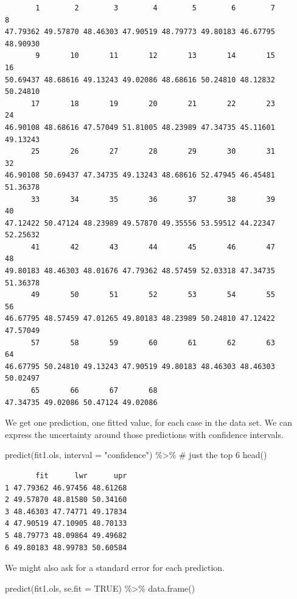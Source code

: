 \documentclass[
  letterpaper,
  DIV=11,
  numbers=noendperiod]{scrartcl}
\newenvironment{Shaded}{\begin{snugshade}}{\end{snugshade}}
\newcommand{\AttributeTok}[1]{\textcolor[rgb]{0.40,0.45,0.13}{#1}}
\newcommand{\CommentTok}[1]{\textcolor[rgb]{0.37,0.37,0.37}{#1}}
\newcommand{\ConstantTok}[1]{\textcolor[rgb]{0.56,0.35,0.01}{#1}}
\newcommand{\FunctionTok}[1]{\textcolor[rgb]{0.28,0.35,0.67}{#1}}
\newcommand{\NormalTok}[1]{\textcolor[rgb]{0.00,0.23,0.31}{#1}}
\newcommand{\SpecialCharTok}[1]{\textcolor[rgb]{0.37,0.37,0.37}{#1}}
\newcommand{\StringTok}[1]{\textcolor[rgb]{0.13,0.47,0.30}{#1}}
\begin{document}
\begin{verbatim}
       1        2        3        4        5        6        7        8 
47.79362 49.57870 48.46303 47.90519 48.79773 49.80183 46.67795 48.90930 
       9       10       11       12       13       14       15       16 
50.69437 48.68616 49.13243 49.02086 48.68616 50.24810 48.12832 50.24810 
      17       18       19       20       21       22       23       24 
46.90108 48.68616 47.57049 51.81005 48.23989 47.34735 45.11601 49.13243 
      25       26       27       28       29       30       31       32 
46.90108 50.69437 47.34735 49.13243 48.68616 52.47945 46.45481 51.36378 
      33       34       35       36       37       38       39       40 
47.12422 50.47124 48.23989 49.57870 49.35556 53.59512 44.22347 52.25632 
      41       42       43       44       45       46       47       48 
49.80183 48.46303 48.01676 47.79362 48.57459 52.03318 47.34735 51.36378 
      49       50       51       52       53       54       55       56 
46.67795 48.57459 47.01265 49.80183 48.23989 50.24810 47.12422 47.57049 
      57       58       59       60       61       62       63       64 
46.67795 50.24810 49.13243 47.90519 49.80183 48.46303 48.46303 50.02497 
      65       66       67       68 
47.34735 49.02086 50.47124 49.02086 
\end{verbatim}

We get one prediction, one fitted value, for each case in the data set.
We can express the uncertainty around those predictions with confidence
intervals.

\begin{Shaded}
\begin{Highlighting}[]
\FunctionTok{predict}\NormalTok{(fit1.ols,}
        \AttributeTok{interval =} \StringTok{"confidence"}\NormalTok{) }\SpecialCharTok{\%\textgreater{}\%} 
  \CommentTok{\# just the top 6}
  \FunctionTok{head}\NormalTok{()}
\end{Highlighting}
\end{Shaded}

\begin{verbatim}
       fit      lwr      upr
1 47.79362 46.97456 48.61268
2 49.57870 48.81580 50.34160
3 48.46303 47.74771 49.17834
4 47.90519 47.10905 48.70133
5 48.79773 48.09864 49.49682
6 49.80183 48.99783 50.60584
\end{verbatim}

We might also ask for a standard error for each prediction.

\begin{Shaded}
\begin{Highlighting}[]
\FunctionTok{predict}\NormalTok{(fit1.ols,}
        \AttributeTok{se.fit =} \ConstantTok{TRUE}\NormalTok{) }\SpecialCharTok{\%\textgreater{}\%} 
  \FunctionTok{data.frame}\NormalTok{()}
\end{Highlighting}
\end{Shaded}
\end{document}
